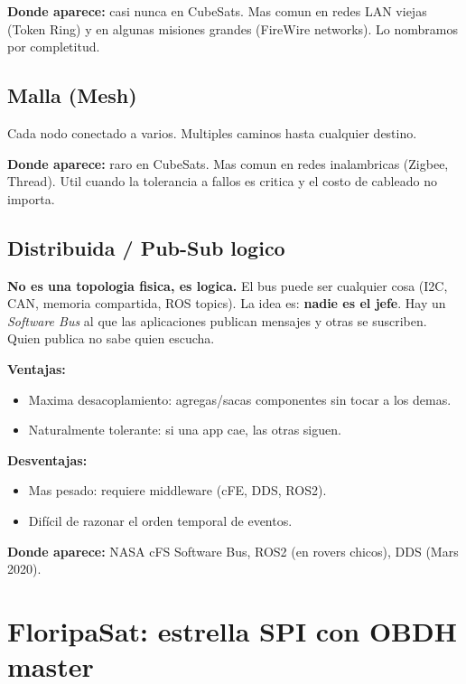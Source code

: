 \documentclass[11pt,a4paper,oneside,openright]{book}
\begin{document}
\textbf{Donde aparece:} casi nunca en CubeSats. Mas comun en redes
LAN viejas (Token Ring) y en algunas misiones grandes (FireWire
networks). Lo nombramos por completitud.

\section{Malla (Mesh)}

Cada nodo conectado a varios. Multiples caminos hasta cualquier destino.

\textbf{Donde aparece:} raro en CubeSats. Mas comun en redes
inalambricas (Zigbee, Thread). Util cuando la tolerancia a fallos
es critica y el costo de cableado no importa.

\section{Distribuida / Pub-Sub logico}

\textbf{No es una topologia fisica, es logica.} El bus puede ser
cualquier cosa (I2C, CAN, memoria compartida, ROS topics). La idea
es: \textbf{nadie es el jefe}. Hay un \emph{Software Bus} al que las
aplicaciones publican mensajes y otras se suscriben. Quien publica no
sabe quien escucha.

\textbf{Ventajas:}
\begin{itemize}[leftmargin=2em]
  \item Maxima desacoplamiento: agregas/sacas componentes sin tocar a
    los demas.
  \item Naturalmente tolerante: si una app cae, las otras siguen.
\end{itemize}

\textbf{Desventajas:}
\begin{itemize}[leftmargin=2em]
  \item Mas pesado: requiere middleware (cFE, DDS, ROS2).
  \item Difícil de razonar el orden temporal de eventos.
\end{itemize}

\textbf{Donde aparece:} NASA cFS Software Bus, ROS2 (en rovers
chicos), DDS (Mars 2020).

\chapter{FloripaSat: estrella SPI con OBDH master}
\end{document}
